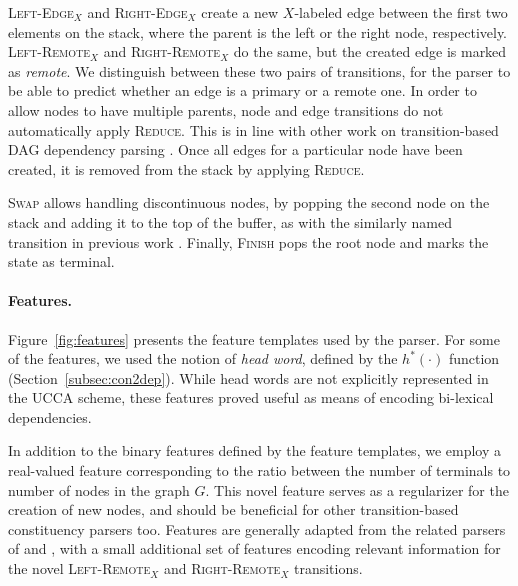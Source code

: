 \documentclass[11pt]{article}
\newcommand{\secref}[1]{Section~\ref{#1}}
\newcommand{\figref}[1]{Figure~\ref{#1}}
\begin{document}
\textsc{Left-Edge$_X$} and \textsc{Right-Edge$_X$} create a new $X$-labeled edge between the first two elements on the stack, where the parent is the left or the right node, respectively. \textsc{Left-Remote$_X$} and \textsc{Right-Remote$_X$} do the same, but the created edge is marked as \textit{remote}. We distinguish between these two pairs of transitions, for the parser to be able to predict whether an edge is a primary or a remote one.
In order to allow nodes to have multiple parents, node and edge transitions do not automatically
apply \textsc{Reduce}. This is in line with other work on
transition-based DAG dependency parsing \cite{sagae2008shift,tokgoz2015transition}.
Once all edges for a particular node have been created, it is removed from the stack
by applying \textsc{Reduce}.

\textsc{Swap} allows handling discontinuous nodes, by popping the second
node on the stack and adding it to the top of the buffer, as with the similarly
named transition in previous work \cite{nivre2009non,maier2015discontinuous}.
Finally, \textsc{Finish} pops the root node and marks the state as terminal.

\paragraph{Features.}
\label{subsec:features}

\figref{fig:features} presents the feature templates used by the parser.
For some of the features, we used the notion of \textit{head word},
defined by the $h^*(\cdot)$ function (\secref{subsec:con2dep}).
While head words are not explicitly represented in the UCCA scheme, these
features proved useful as means of encoding bi-lexical dependencies.

In addition to the binary features defined by the feature templates,
we employ a real-valued feature corresponding to the ratio between the number of terminals to number of nodes
in the graph $G$. This novel feature serves as a regularizer for the creation of new nodes, and should be beneficial for other transition-based constituency parsers too.
Features are generally adapted from the related parsers of  and
, with a small additional set of features encoding relevant information
for the novel \textsc{Left-Remote$_X$} and \textsc{Right-Remote$_X$} transitions.

\end{document}
